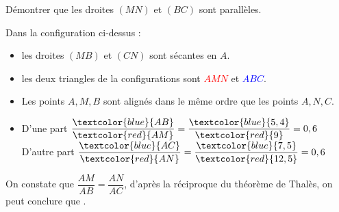 \begin{methode*1}
\begin{minipage}{8cm}
                Démontrer que les droites $(MN)$ et $(BC)$ sont parallèles.
            \end{minipage}
            
            \correction
            Dans la configuration ci-dessus : 
            \begin{itemize}
                \item les droites $(MB)$ et $(CN)$ sont sécantes en $A$.                
                \item les deux triangles de la configurations sont \textcolor{red}{$AMN$} et \textcolor{blue}{$ABC$}.
                \item Les points $A, M, B$ sont alignés dans le même ordre que les points $A, N, C$.
                \medskip
                \item D'une part $\dfrac{\textcolor{blue}{AB}}{\textcolor{red}{AM}} = \dfrac{\textcolor{blue}{5,4}}{\textcolor{red}{9}}=0,6$
                \hfill
                D'autre part $\dfrac{\textcolor{blue}{AC}}{\textcolor{red}{AN}} = \dfrac{\textcolor{blue}{7,5}}{\textcolor{red}{12,5}}=0,6$
            \end{itemize}
            On constate que $\dfrac{AM}{AB} = \dfrac{AN}{AC}$, d'après la réciproque du théorème de Thalès, on peut conclure que .
        \end{methode*1}

    



